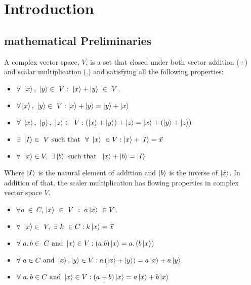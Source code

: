 \chapter{Introduction}

\section{ mathematical Preliminaries }



\begin{defn}


A complex vector space, $V$, is a set that  closed under both vector addition
($ +$) and scalar multiplication (.) and satisfying all the following properties:
\begin{itemize}
\item $\forall~ \ket{x},~\ket{y} \in ~ V : ~\ket{x}+\ket{y} ~\in~ V $.
\item $\forall \ket{x},~\ket{y} \in ~ V : \ket{x}+\ket{y}=\ket{y}+\ket{x}$
\item $\forall~ \ket{x},~\ket{y}, ~\ket{z} \in ~ V:\left(\ket{x}+\ket{y}\right)+\ket{z}=\ket{x}+\left(\ket{y}+\ket{z}\right)$
\item $\exists ~\ket{I} \in ~V~ \text{such that }~ \forall~ \ket{x} ~\in V: \ket{x}+\ket{I}=\vec{x}$
\item $\forall ~\ket{x} \in V,~ \exists \ket{b} ~ \text{such that } ~\ket{x}+\ket{b}= \ket{I}$
\end{itemize}
Where $\ket{I}$ is the natural element of addition and $\ket{b}$ is the inverse of $\ket{x}$.
In addition of that, the scaler multiplication has flowing properties in complex vector space $V$.
\begin{itemize}
\item $\forall a~\in ~C$, $\ket{x}~\in ~V~ :~ a\ket{x}~ \in V$.
\item $\forall ~\ket{x} \in ~V,~ \exists~ k ~\in C :k\ket{x}=\vec{x}$
\item $\forall ~ a,b \in ~C ~\text{and} ~ \ket{x}\in V :\left(a.b\right) \ket{x}=a.\left(b \ket{x}\right)$
\item $\forall ~ a \in C ~\text{and} ~ \ket{x}, \ket{y}\in V:a\left(\ket{x}+\ket{y}\right)=a\ket{x}+a\ket{y}$
\item $\forall ~ a,b \in C ~\text{and} ~ \ket{x}\in V:\left(a+b\right)\ket{x}=a\ket{x}+b\ket{x}$
\end{itemize}
\end{defn}

